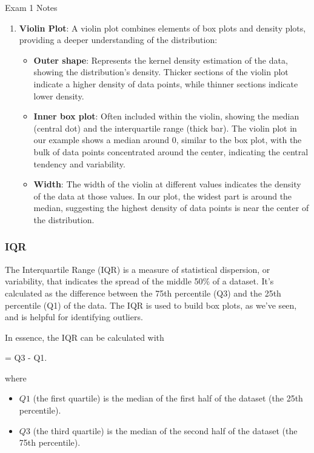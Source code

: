\begin{examnotes}{Exam 1 Notes}
\begin{enumerate}
\begin{itemize}
        \end{itemize}
        \item \textbf{Violin Plot}: A violin plot combines elements of box plots and density plots, providing a deeper understanding of the distribution:
        \begin{itemize}
            \item \textbf{Outer shape}: Represents the kernel density estimation of the data, showing the distribution's density. Thicker sections of the violin plot indicate a higher density of data 
            points, while thinner sections indicate lower density.
            \item \textbf{Inner box plot}: Often included within the violin, showing the median (central dot) and the interquartile range (thick bar). The violin plot in our example shows a median 
            around 0, similar to the box plot, with the bulk of data points concentrated around the center, indicating the central tendency and variability.
            \item \textbf{Width}: The width of the violin at different values indicates the density of the data at those values. In our plot, the widest part is around the median, suggesting the highest 
            density of data points is near the center of the distribution.
        \end{itemize}
    \end{enumerate}

    \subsubsection*{IQR}

    The Interquartile Range (IQR) is a measure of statistical dispersion, or variability, that indicates the spread of the middle 50\% of a dataset. It's calculated as the difference between the 75th 
    percentile (Q3) and the 25th percentile (Q1) of the data. The IQR is used to build box plots, as we've seen, and is helpful for identifying outliers.

    In essence, the IQR can be calculated with

    \begin{center}
        \begin{highlightbox}
             = Q3 - Q1.
        \end{highlightbox}
    \end{center}
    where
    \begin{itemize}
        \item $Q1$ (the first quartile) is the median of the first half of the dataset (the 25th percentile).
        \item $Q3$ (the third quartile) is the median of the second half of the dataset (the 75th percentile).
    \end{itemize}


\end{examnotes}

